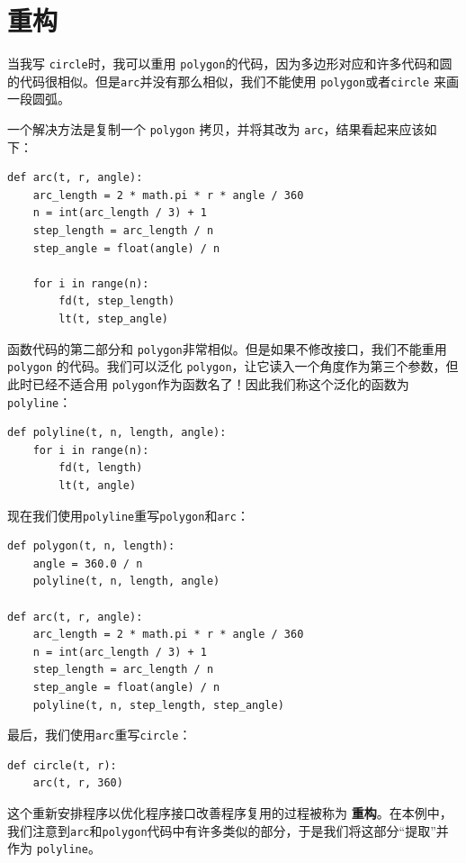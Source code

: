 \section{重构}
\label{重构}

当我写 {\tt circle}时，我可以重用 {\tt polygon}的代码，因为多边形对应和许多代码和圆的代码很相似。但是{\tt arc}并没有那么相似，我们不能使用 {\tt polygon}或者{\tt circle} 来画一段圆弧。

一个解决方法是复制一个 {\tt polygon} 拷贝，并将其改为 {\tt arc}，结果看起来应该如下：

\beforeverb
\begin{verbatim}
def arc(t, r, angle):
    arc_length = 2 * math.pi * r * angle / 360
    n = int(arc_length / 3) + 1
    step_length = arc_length / n
    step_angle = float(angle) / n
    
    for i in range(n):
        fd(t, step_length)
        lt(t, step_angle)
\end{verbatim}
\afterverb
%
函数代码的第二部分和 {\tt polygon}非常相似。但是如果不修改接口，我们不能重用 {\tt polygon} 的代码。我们可以泛化 {\tt polygon}，让它读入一个角度作为第三个参数，但此时已经不适合用 {\tt polygon}作为函数名了！因此我们称这个泛化的函数为 {\tt polyline}：

\beforeverb
\begin{verbatim}
def polyline(t, n, length, angle):
    for i in range(n):
        fd(t, length)
        lt(t, angle)
\end{verbatim}
\afterverb
%
现在我们使用{\tt polyline}重写{\tt polygon}和{\tt arc}：

\beforeverb
\begin{verbatim}
def polygon(t, n, length):
    angle = 360.0 / n
    polyline(t, n, length, angle)

def arc(t, r, angle):
    arc_length = 2 * math.pi * r * angle / 360
    n = int(arc_length / 3) + 1
    step_length = arc_length / n
    step_angle = float(angle) / n
    polyline(t, n, step_length, step_angle)
\end{verbatim}
\afterverb
%
最后，我们使用{\tt arc}重写{\tt circle}：

\beforeverb
\begin{verbatim}
def circle(t, r):
    arc(t, r, 360)
\end{verbatim}
\afterverb
%
这个重新安排程序以优化程序接口改善程序复用的过程被称为 {\bf 重构}。在本例中，我们注意到{\tt arc}和{\tt polygon}代码中有许多类似的部分，于是我们将这部分“提取”并作为 {\tt polyline}。


